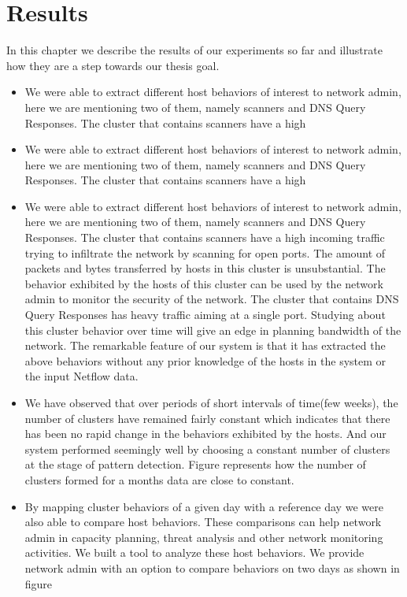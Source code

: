 
\chapter{Results}

In this chapter we describe the results of our experiments so far and illustrate how they are a step towards our thesis goal.

\begin{itemize}
	\item We were able to extract different host behaviors of interest to network admin, here we are mentioning two of them, namely scanners and DNS Query Responses. The cluster that contains scanners have a high
	
	\item 
	We were able to extract different host behaviors of interest to network admin, here we are mentioning two of them, namely scanners and DNS Query Responses. The cluster that contains scanners have a high
\end{itemize}

\begin{itemize}
\item We were able to extract different host behaviors of interest to network admin, here we are mentioning two of them, namely scanners and DNS Query Responses. The cluster that contains scanners have a high incoming traffic trying to infiltrate the
network by scanning for open ports. The amount of packets and bytes transferred by hosts in this cluster is unsubstantial. The behavior exhibited by the hosts of this
cluster can be used by the network admin to monitor the security of the network.
The cluster that contains DNS Query Responses has heavy traffic aiming at a single
port. Studying about this cluster behavior over time will give an edge in planning
bandwidth of the network. The remarkable feature of our system is that it has extracted
the above behaviors without any prior knowledge of the hosts in the system or the input Netflow data.
\item We have observed that over periods of short intervals of time(few weeks), the number
of clusters have remained fairly constant which indicates that there has been no
rapid change in the behaviors exhibited by the hosts. And our system performed
seemingly well by choosing a constant number of clusters at the stage of pattern
detection. Figure  represents how the number of clusters formed for a months
data are close to constant.

\item  By mapping cluster behaviors of a given day with a reference day we were also able
to compare host behaviors. These comparisons can help network admin in capacity
planning, threat analysis and other network monitoring activities. We built a tool to analyze these host behaviors. 
We provide network admin with an option to compare
behaviors on two days as shown in figure 


\end{itemize}

